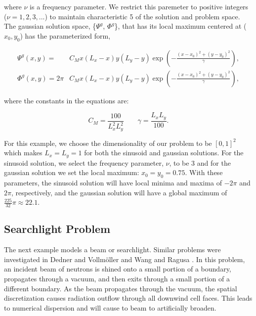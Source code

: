 \noindent where $\nu$ is a frequency parameter. We restrict this paremeter to positive integers ($\nu = 1,2,3,...$) to maintain characteristic 5 of the solution and problem space. The gaussian solution space, \{$\Psi^g$, $\Phi^g$\}, that has its local maximum centered at ($x_0,y_0$) has the parameterized form,

\begin{equation}
\label{eq::BF_Results_MMS_gaussfluxsols}
\begin{aligned}
\Psi^g (x,y) = &C_M x (L_x - x) y (L_y - y) \exp(-\frac{(x-x_0)^2 + (y-y_0)^2}{\gamma}), \\ 
\Phi^g (x,y) = 2 \pi &C_M x (L_x - x) y (L_y - y) \exp(-\frac{(x-x_0)^2 + (y-y_0)^2}{\gamma}),
\end{aligned} 
\end{equation}

\noindent where the constants in the equations are:

\begin{equation}
\label{eq::BF_Results_MMS_gaussconsts}
C_M = \frac{100}{L_x^2 L_y^2} \qquad \gamma = \frac{L_x L_y}{100} .
\end{equation}

For this example, we choose the dimensionality of our problem to be $[0,1]^2$ which makes $L_x=L_y=1$ for both the sinusoid and gaussian solutions. For the sinusoid solution, we select the frequency parameter, $\nu$, to be 3 and for the gaussian solution we set the local maximum: $x_0=y_0 = 0.75$. With these parameters, the sinusoid solution will have local minima and maxima of $-2 \pi$ and $2 \pi$, respectively, and the gaussian solution will have a global maximum of $\frac{225}{32} \pi \approx 22.1$.

\subsection{Searchlight Problem}
\label{sec::BF_Results_SL}

The next example models a beam or searchlight. Similar problems were investigated in Dedner and Vollm{\"o}ller \cite{dedner2002adaptive} and Wang and Ragusa \cite{wang2011standard}. In this problem, an incident beam of neutrons is shined onto a small portion of a boundary, propagates through a vacuum, and then exits through a small portion of a different boundary. As the beam propagates through the vacuum, the spatial discretization causes radiation outflow through all downwind cell faces. This leads to numerical dispersion and will cause to beam to artificially broaden.

